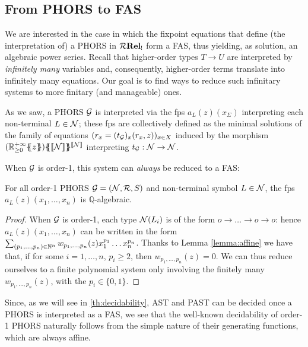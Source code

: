 

\subsection{From PHORS to FAS}


	We are interested in the case in which the fixpoint equations that define (the interpretation of) a PHORS in $\mathcal{R}\mathbf{Rel_!}$ form a FAS, thus yielding, as solution, an algebraic power series. Recall that higher-order types $T\to U$ are interpreted by \emph{infinitely many} variables and, consequently, higher-order terms translate into infinitely many equations.
Our goal is to find ways to {reduce} such infinitary systems to more finitary (and manageable) ones.	

	
	   As we saw, a PHORS $\mathcal{G}$ is interpreted via the fps $a_{L}(z)(x_\Sigma)$ interpreting each non-terminal $L\in \mathcal{N}$; these fps are collectively defined as the minimal solutions of the family of equations
$(r_x = (t_{\mathcal{G}})_x(r_x, z))_{x \in X}$
induced by the morphism $\fps{(\fps{\Rinf}{z})}{\model{\nonterm}}^{\model{\nonterm}}$ interpreting $t_{\mathcal{G}}:\mathcal{N}\to \mathcal{N}$.


When $\mathcal{G}$ is order-1, this system can \emph{always} be reduced to a FAS:
\begin{proposition}
For all order-1 PHORS $\mathcal{G}=(\mathcal{N}, \mathcal{R},S)$ and non-terminal symbol $L\in \mathcal{N}$, the fps $a_{L}(z)(x_1,\dots, x_n)$ is $\mathbb Q$-algebraic.
\end{proposition}
\begin{proof}
When $\mathcal{G}$ is order-1, each type $\mathcal{N}(L_i)$ is of the form $o\to\dots \to o\to o$:
 hence $a_L(z)(x_1,\dots, x_n)$ can be written in the form $\sum_{(p_1,\dots,p_n)\in \mathbb{N}^n} w_{p_1,\dots, p_n}(z)x_1^{p_1}\dots x_n^{p_n}$. 
Thanks to Lemma \ref{lemma:affine} we have that, if for some $i=1,\dots, n$, $p_i\geq 2$, then $ 
w_{p_1,\dots, p_n}(z)=0$. We can thus reduce ourselves to a finite polynomial system only involving the finitely many $w_{p_1,\dots, p_n}(z)$, with the $p_i\in \{0,1\}$.
\end{proof}
Since, as we will see in \ref{th:decidability}, AST and PAST can be decided once a PHORS is interpreted as a FAS, we see that the well-known decidability of order-1 PHORS naturally follows from the simple nature of their generating functions, which are always affine.  

